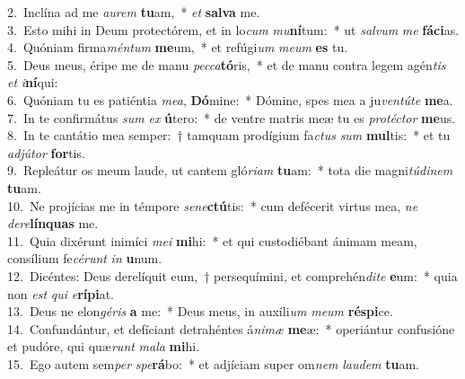 {2.~}Inclína ad me \textit{au}\textit{rem} \textbf{tu}am,~* \textit{et} \textbf{sal}\textbf{va} me.\\
{3.~}Esto mihi in Deum protectórem, et in lo\textit{cum} \textit{mu}\textbf{ní}tum:~* ut \textit{sal}\textit{vum} \textit{me} \textbf{fá}\textbf{ci}as.\\
{4.~}Quóniam firma\textit{mén}\textit{tum} \textbf{me}um,~* et refúgi\textit{um} \textit{me}\textit{um} \textbf{es} tu.\\
{5.~}Deus meus, éripe me de manu \textit{pec}\textit{ca}\textbf{tó}ris,~* et de manu contra legem agén\textit{tis} \textit{et} \textit{i}\textbf{ní}qui:\\
{6.~}Quóniam tu es patiéntia \textit{me}\textit{a}, \textbf{Dó}mine:~* Dómine, spes mea a ju\textit{ven}\textit{tú}\textit{te} \textbf{me}a.\\
{7.~}In te confirmátus \textit{sum} \textit{ex} \textbf{ú}tero:~* de ventre matris meæ tu es \textit{pro}\textit{té}\textit{ctor} \textbf{me}us.\\
{8.~}In te cantátio mea semper:~† tamquam prodígium fa\textit{ctus} \textit{sum} \textbf{mul}tis:~* et tu \textit{ad}\textit{jú}\textit{tor} \textbf{for}tis.\\
{9.~}Repleátur os meum laude, ut cantem gló\textit{ri}\textit{am} \textbf{tu}am:~* tota die magni\textit{tú}\textit{di}\textit{nem} \textbf{tu}am.\\
{10.~}Ne projícias me in témpore \textit{se}\textit{ne}\textbf{ctú}tis:~* cum defécerit virtus mea, \textit{ne} \textit{de}\textit{re}\textbf{lín}\textbf{quas} me.\\
{11.~}Quia dixérunt inimíci \textit{me}\textit{i} \textbf{mi}hi:~* et qui custodiébant ánimam meam, consílium fe\textit{cé}\textit{runt} \textit{in} \textbf{u}num.\\
{12.~}Dicéntes: Deus derelíquit eum,~† persequímini, et comprehén\textit{di}\textit{te} \textbf{e}um:~* quia non \textit{est} \textit{qui} \textit{e}\textbf{rí}\textbf{pi}at.\\
{13.~}Deus ne elon\textit{gé}\textit{ris} \textbf{a} me:~* Deus meus, in auxíli\textit{um} \textit{me}\textit{um} \textbf{ré}\textbf{spi}ce.\\
{14.~}Confundántur, et defíciant detrahéntes á\textit{ni}\textit{mæ} \textbf{me}æ:~* operiántur confusióne et pudóre, qui quæ\textit{runt} \textit{ma}\textit{la} \textbf{mi}hi.\\
{15.~}Ego autem sem\textit{per} \textit{spe}\textbf{rá}bo:~* et adjíciam super om\textit{nem} \textit{lau}\textit{dem} \textbf{tu}am.\\
